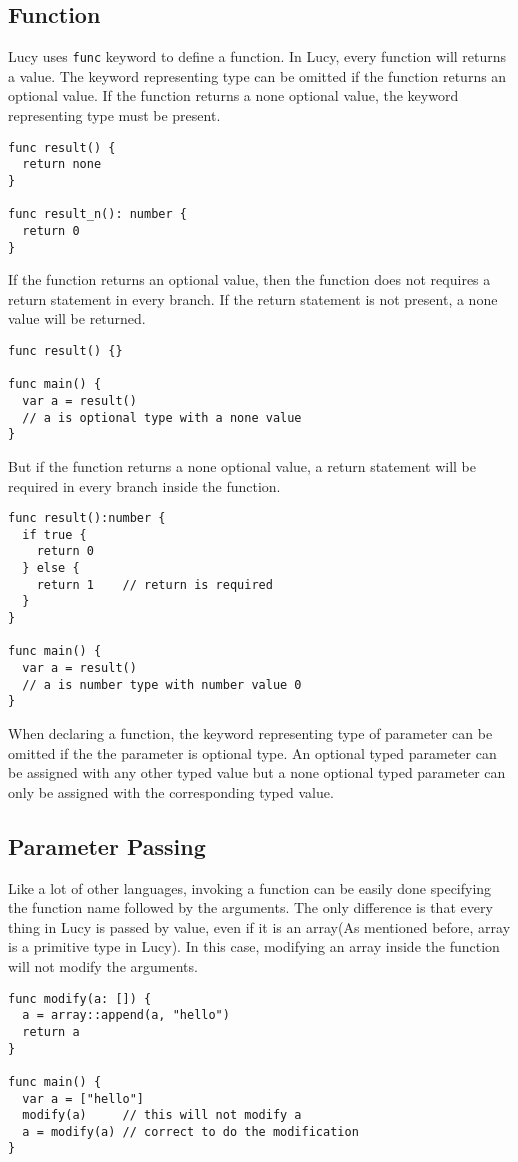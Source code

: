 \subsection{Function}
Lucy uses \texttt{func} keyword to define a function. In Lucy, every function will returns a value. The keyword representing type can be omitted if the function returns an optional value. If the function returns a none optional value, the keyword representing type must be present.
\begin{lstlisting}
func result() {
  return none
}

func result_n(): number {
  return 0
}
\end{lstlisting}
If the function returns an optional value, then the function does not requires a return statement in every branch. If the return statement is not present, a none value will be returned.
\begin{lstlisting}
func result() {}

func main() {
  var a = result()
  // a is optional type with a none value
}
\end{lstlisting}
But if the function returns a none optional value, a return statement will be required in every branch inside the function.
\begin{lstlisting}
func result():number {
  if true {
    return 0
  } else {
    return 1    // return is required
  }
}

func main() {
  var a = result()
  // a is number type with number value 0
}
\end{lstlisting}
When declaring a function, the keyword representing type of parameter can be omitted if the the parameter is optional type. An optional typed parameter can be assigned with any other typed value but a none optional typed parameter can only be assigned with the corresponding typed value.

\subsection{Parameter Passing}
Like a lot of other languages, invoking a function can be easily done specifying the function name followed by the arguments. The only difference is that every thing in Lucy is passed by value, even if it is an array(As mentioned before, array is a primitive type in Lucy). In this case, modifying an array inside the function will not modify the arguments.
\begin{lstlisting}
func modify(a: []) {
  a = array::append(a, "hello")
  return a
}

func main() {
  var a = ["hello"]
  modify(a)     // this will not modify a
  a = modify(a) // correct to do the modification
}
\end{lstlisting}


